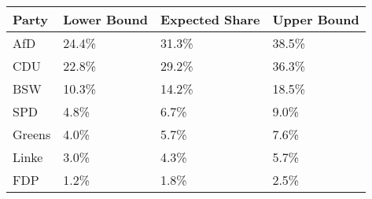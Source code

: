 \begin{tabular}{llll}
  \hline
Party & Lower Bound & Expected Share & Upper Bound \\ 
  \hline
AfD & 24.4\% & 31.3\% & 38.5\% \\ 
  CDU & 22.8\% & 29.2\% & 36.3\% \\ 
  BSW & 10.3\% & 14.2\% & 18.5\% \\ 
  SPD & 4.8\% & 6.7\% & 9.0\% \\ 
  Greens & 4.0\% & 5.7\% & 7.6\% \\ 
  Linke & 3.0\% & 4.3\% & 5.7\% \\ 
  FDP & 1.2\% & 1.8\% & 2.5\% \\ 
   \hline
\end{tabular}
